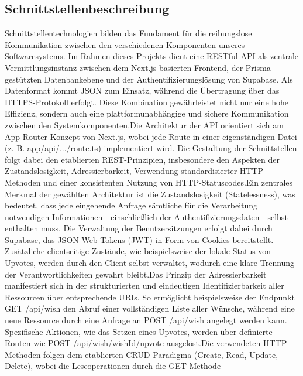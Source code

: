 \documentclass[a4paper,12pt]{article}
\begin{document}
\subsection{Schnittstellenbeschreibung}
Schnittstellentechnologien bilden das Fundament für die reibungslose Kommunikation zwischen den verschiedenen Komponenten unseres Softwaresystems. Im Rahmen dieses Projekts dient eine RESTful-API als zentrale Vermittlungsinstanz zwischen dem Next.js-basierten Frontend, der Prisma-gestützten Datenbankebene und der Authentifizierungslösung von Supabase. Als Datenformat kommt JSON zum Einsatz, während die Übertragung über das HTTPS-Protokoll erfolgt. Diese Kombination gewährleistet nicht nur eine hohe Effizienz, sondern auch eine plattformunabhängige und sichere Kommunikation zwischen den Systemkomponenten.\newline \newline Die Architektur der API orientiert sich am App-Router-Konzept von Next.js, wobei jede Route in einer eigenständigen Datei (z. B. app/api/.../route.ts) implementiert wird. Die Gestaltung der Schnittstellen folgt dabei den etablierten REST-Prinzipien, insbesondere den Aspekten der Zustandslosigkeit, Adressierbarkeit, Verwendung standardisierter HTTP-Methoden und einer konsistenten Nutzung von HTTP-Statuscodes.\newline\newline Ein zentrales Merkmal der gewählten Architektur ist die Zustandslosigkeit (Statelessness), was bedeutet, dass jede eingehende Anfrage sämtliche für die Verarbeitung notwendigen Informationen - einschließlich der Authentifizierungsdaten - selbst enthalten muss. Die Verwaltung der Benutzersitzungen erfolgt dabei durch Supabase, das JSON-Web-Tokens (JWT) in Form von Cookies bereitstellt. Zusätzliche clientseitige Zustände, wie beispielsweise der lokale Status von Upvotes, werden durch den Client selbst verwaltet, wodurch eine klare Trennung der Verantwortlichkeiten gewahrt bleibt.\newline \newline Das Prinzip der Adressierbarkeit manifestiert sich in der strukturierten und eindeutigen Identifizierbarkeit aller Ressourcen über entsprechende URIs. So ermöglicht beispielsweise der Endpunkt GET /api/wish den Abruf einer vollständigen Liste aller Wünsche, während eine neue Ressource durch eine Anfrage an POST /api/wish angelegt werden kann. Spezifische Aktionen, wie das Setzen eines Upvotes, werden über definierte Routen wie POST /api/wish/{wishId}/upvote ausgelöst.\newline \newline Die verwendeten HTTP-Methoden folgen dem etablierten CRUD-Paradigma (Create, Read, Update, Delete), wobei die Leseoperationen durch die GET-Methode 
\end{document}
